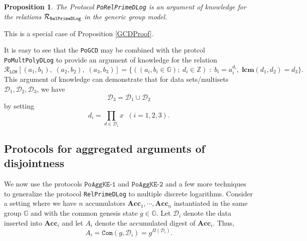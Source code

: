 \documentclass[11pt, lettersize, notitlepage, leqno, footskip=0.6cm]{article}
\newcommand{\bz}{\mathbb Z}
\newcommand{\ttt}{\texttt}
\newcommand{\Acc}{\mbf{Acc}}
\newcommand{\mc}{\mathcal}
\newcommand{\mb}{\mathbb}
\newcommand{\mbf}{\mathbf}
\newcommand{\vs}{\vspace{-0.15cm}}
\newcommand{\noin}{\noindent}
\newcommand{\LCM}{\mbf{lcm}}
\newtheorem{Prop}[Thm]{Proposition}
\numberwithin{equation}{section}
\begin{document}
\vspace{0.1cm}

\begin{Prop} The Protocol \verb|PoRelPrimeDLog| is an argument of knowledge for the relations $\mc{R}_{{\tt{RelPrimeDLog}}}$ in the generic group model.\end{Prop}

\begin{prf} This is a special case of Proposition \ref{GCDProof}.\end{prf}



It is easy to see that the \verb|PoGCD| may be combined with the protcol \verb|PoMultPolyDLog| to provide an argument of knowledge for the relation \vs $$\mc{R}_{{\ttt{LCM}}}[(a_1,b_1),\;(a_2,b_2), \; (a_3, b_3)] = \{((a_i, b_i\in\mb{G});\;d_i\in\bz)\;:\; b_i = a_i^{d_i},\;\LCM(d_1,d_2)=d_3 \} .$$ This argument of knowledge can demonstrate that for data sets/multisets $\mc{D}_1,\mc{D}_2, \mc{D}_3$, we have \vs $$\mc{D}_3 = \mc{D}_1\cup \mc{D}_2 $$ by setting \vs $$ d_i = \prod\limits_{d\in\mc{D}_i} x\;\;(i=1,2,3).$$







\subsection{\fontsize{11}{11}\selectfont Protocols for aggregated arguments of disjointness}

We now use the protocols \hyperlink{AggKE-1}{$\ttt{PoAggKE-1}$} and \hyperlink{AggKE-2}{$\ttt{PoAggKE-2}$} and a few more techniques to generalize the protocol \verb|RelPrimeDLog| to multiple discrete logarithms. Consider a setting where we have $n$ accumulators $\Acc_1,\cdots,\Acc_n$ instantiated in the same group $\mb{G}$ and with the common genesis state $g\in\mb{G}$. Let $\mc{D}_i$ denote the data inserted into $\Acc_i$ and let $A_i$ denote the accumulated digest of $\Acc_i$. Thus, \vs $$A_i = \ttt{Com}(g, \mc{D}_i) =  g^{\Pi(\mc{D}_i)} .$$ 
\end{document}
